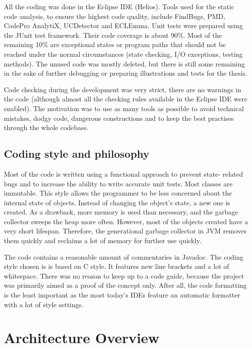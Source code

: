 All the coding was done in the Eclipse IDE (Helios). Tools used for the static code analysis, to ensure the highest code quality, include FindBugs, PMD, CodePro AnalytiX, UCDetector and ECLEmma. Unit tests were prepared using the JUnit test framework. Their code coverage is about 90\%. Most of the remaining 10\% are exceptional states or program paths that should not be reached under the normal circumstances (state checking, I/O exceptions, testing methods). The unused code was mostly deleted, but there is still some remaining in the sake of further debugging or preparing illustrations and tests for the thesis.

Code checking during the development was very strict, there are no warnings in the code (although almost all the checking rules available in the Eclipse IDE were enabled). The motivation was to use as many tools as possible to avoid technical mistakes, dodgy code, dangerous constructions and to keep the best practises through the whole codebase.

\subsection{Coding style and philosophy}

Most of the code is written using a functional approach to prevent state- related bugs and to increase the ability to write accurate unit tests. Most classes are immutable. This style allows the programmer to be less concerned about the internal state of objects. Instead of changing the object's state, a new one is created. As a drawback, more memory is used than necessary, and the garbage collector sweeps the heap more often. However, most of the objects created have a very short lifespan. Therefore, the generational garbage collector in JVM removes them quickly and reclaims a lot of memory for further use quickly.

The code contains a reasonable amount of commentaries in Javadoc. The coding style chosen is is based on C style. It features new line brackets and a lot of whitespace. There was no reason to keep up to a code guide, because the project was primarily aimed as a proof of the concept only. After all, the code formatting is the least important as the most today's IDEs feature an automatic formatter with a lot of style settings.

\section{Architecture Overview}

